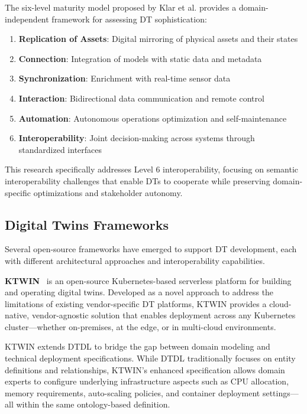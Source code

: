 The six-level maturity model proposed by Klar et al. \cite{Klar_2024} provides a domain-independent framework for assessing DT sophistication:
\begin{enumerate}
    \item \textbf{Replication of Assets}: Digital mirroring of physical assets and their states
    \item \textbf{Connection}: Integration of models with static data and metadata
    \item \textbf{Synchronization}: Enrichment with real-time sensor data
    \item \textbf{Interaction}: Bidirectional data communication and remote control
    \item \textbf{Automation}: Autonomous operations optimization and self-maintenance
    \item \textbf{Interoperability}: Joint decision-making across systems through standardized interfaces
\end{enumerate}

This research specifically addresses Level 6 interoperability,
    focusing on semantic interoperability challenges that enable DTs to cooperate while 
    preserving domain-specific optimizations and stakeholder autonomy.

\subsection{Digital Twins Frameworks}

Several open-source frameworks have emerged to support DT development, each with different architectural approaches and interoperability capabilities.

\textbf{KTWIN}~\cite{Wermann_Wickboldt_2025}
    is an open-source Kubernetes-based serverless platform for building and operating digital twins.
Developed as a novel approach to address the limitations of existing vendor-specific DT platforms,
    KTWIN provides a cloud-native, vendor-agnostic solution that enables deployment across 
    any Kubernetes cluster—whether on-premises, at the edge, or in multi-cloud environments.

KTWIN extends DTDL to bridge the gap between 
    domain modeling and technical deployment specifications.
While DTDL traditionally focuses on entity definitions and relationships,
    KTWIN's enhanced specification allows domain experts to configure
    underlying infrastructure aspects such as CPU allocation, memory requirements, 
    auto-scaling policies, and container deployment settings—all within the same ontology-based definition.

